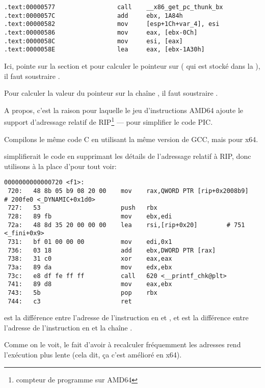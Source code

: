 \begin{lstlisting}[style=customasmx86]
.text:00000577                 call    __x86_get_pc_thunk_bx
.text:0000057C                 add     ebx, 1A84h
.text:00000582                 mov     [esp+1Ch+var_4], esi
.text:00000586                 mov     eax, [ebx-0Ch]
.text:0000058C                 mov     esi, [eax]
.text:0000058E                 lea     eax, [ebx-1A30h]
\end{lstlisting}

Ici, \EBX pointe sur la section  et pour calculer le pointeur sur \globvar{} ( qui est stocké dans
la ), il faut soustraire .

Pour calculer la valeur du pointeur sur la chaîne \retstring{}, il faut soustraire .


A propos, c'est la raison pour laquelle le jeu d'instructions AMD64 ajoute le support d'adressage relatif de RIP\footnote{compteur de programme sur AMD64} --- pour simplifier le code PIC.

Compilons le même code C en utilisant la même version de GCC, mais pour x64.

\IDA simplifierait le code en supprimant les détails de l'adressage relatif à RIP,
donc utilisons  à la place d'\IDA pour tout voir:

\begin{lstlisting}[style=customasmx86]
0000000000000720 <f1>:
 720:	48 8b 05 b9 08 20 00 	mov    rax,QWORD PTR [rip+0x2008b9]        # 200fe0 <_DYNAMIC+0x1d0>
 727:	53                   	push   rbx
 728:	89 fb                	mov    ebx,edi
 72a:	48 8d 35 20 00 00 00 	lea    rsi,[rip+0x20]        # 751 <_fini+0x9>
 731:	bf 01 00 00 00       	mov    edi,0x1
 736:	03 18                	add    ebx,DWORD PTR [rax]
 738:	31 c0                	xor    eax,eax
 73a:	89 da                	mov    edx,ebx
 73c:	e8 df fe ff ff       	call   620 <__printf_chk@plt>
 741:	89 d8                	mov    eax,ebx
 743:	5b                   	pop    rbx
 744:	c3                   	ret    
\end{lstlisting}

 est la différence entre l'adresse de l'instruction en  et \globvar{}, et 
 est la différence entre l'adresse de l'instruction en
 et la chaîne \retstring{}.

Comme on le voit, le fait d'avoir à recalculer fréquemment les adresses rend l'exécution plus lente
(cela dit, ça c'est amélioré en x64).

